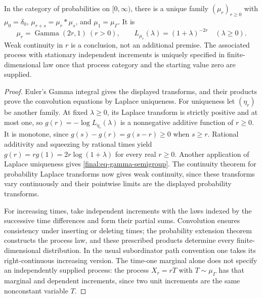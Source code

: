 \begin{theorem}
\label{final:P8}
In the category of probabilities on $[0,\infty)$, there is a unique
family $(\mu_r)_{r\geq0}$ with $\mu_0=\delta_0$,
$\mu_{r+s}=\mu_r*\mu_s$, and $\mu_1=\mu_\Gamma$.
It is
\begin{equation}
 \mu_r=\operatorname{Gamma}(2r,1)\ (r>0),\qquad
 L_{\mu_r}(\lambda)=(1+\lambda)^{-2r}\quad(\lambda\geq0).
 \label{final:eq-gamma-semigroup}
\end{equation}
Weak continuity in $r$ is a conclusion, not an additional premise.
The associated process with stationary independent increments is uniquely
specified in finite-dimensional law once that process category and
the starting value zero are supplied.
\end{theorem}
\begin{proof}
Euler's Gamma integral gives the displayed transforms, and their
products prove the convolution equations by Laplace uniqueness.
For uniqueness let $(\eta_r)$ be another family.  At fixed
$\lambda\geq0$, its Laplace transform is strictly positive and at
most one, so $g(r)=-\log L_{\eta_r}(\lambda)$ is a nonnegative
additive function of $r\geq0$.  It is monotone, since
$g(s)-g(r)=g(s-r)\geq0$ when $s\geq r$.  Rational additivity and
squeezing by rational times yield
$g(r)=r g(1)=2r\log(1+\lambda)$ for every real $r\geq0$.
Another application of Laplace uniqueness gives \eqref{final:eq-gamma-semigroup}.
The continuity theorem for probability Laplace transforms now
gives weak continuity, since these transforms vary continuously
and their pointwise limits are the displayed probability transforms.

For increasing times, take independent increments with the laws
indexed by the successive time differences and form their partial
sums.  Convolution ensures consistency under inserting or deleting
times; the probability extension theorem constructs the process
law, and these prescribed products determine every finite-dimensional
distribution.  In the usual subordinator path convention one takes
its right-continuous increasing version.  The time-one marginal
alone does not specify an independently supplied process: the
process $X_r=rT$ with $T\sim\mu_\Gamma$ has that marginal and
dependent increments, since two unit increments are the same
nonconstant variable $T$.
\end{proof}

